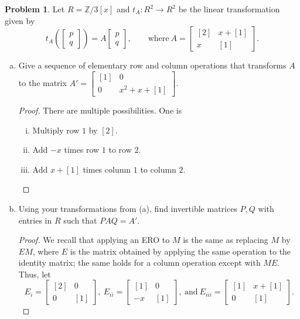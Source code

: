 \documentclass[11pt]{article}
\newcommand{\ZZ}{\mathbb{Z}}
\theoremstyle{definition}
\newtheorem{problem}{Problem}
\begin{document}
\begin{problem} Let $R=\ZZ/3[x]$ and  $t_A:R^2 \to R^2$ be the linear transformation given by 
\[ t_A\left( \begin{bmatrix} p \\ q \end{bmatrix}\right) = A \begin{bmatrix} p \\ q \end{bmatrix}, \qquad \text{where} \ A= \begin{bmatrix} [2] & x+[1] \\ x & [1] \end{bmatrix}.\]
\end{problem}
\begin{enumerate}[(a)]
\item Give a sequence of elementary row and column operations that transforms $A$ to the matrix $A'=\begin{bmatrix} [1] & 0 \\ 0 & x^2 + x + [1]\end{bmatrix}$.
\begin{proof}
There are multiple possibilities. One is
\begin{enumerate}[(i)]
\item Multiply row $1$ by $[2]$.
\item Add $-x$ times row $1$ to row $2$.
\item Add $x+[1]$ times column $1$ to column $2$. \qedhere
\end{enumerate}
\end{proof}
\item Using your transformations from (a), find invertible matrices $P,Q$ with entries in $R$ such that $PAQ=A'$.
\begin{proof} We recall that applying an ERO to $M$ is the same as replacing $M$ by $EM$, where $E$ is the matrix obtained by applying the same operation to the identity matrix; the same holds for a column operation except with $ME$. Thus, let 
\[ E_{i} = \begin{bmatrix} [2] & 0 \\ 0 & [1] \end{bmatrix}, \ E_{ii} = \begin{bmatrix} [1] &0 \\  -x  & [1] \end{bmatrix}, \ \text{and} \  E_{iii}= \begin{bmatrix} [1] & x+[1] \\ 0 & [1] \end{bmatrix}.\]

\end{proof}
\end{enumerate}
\end{document}
